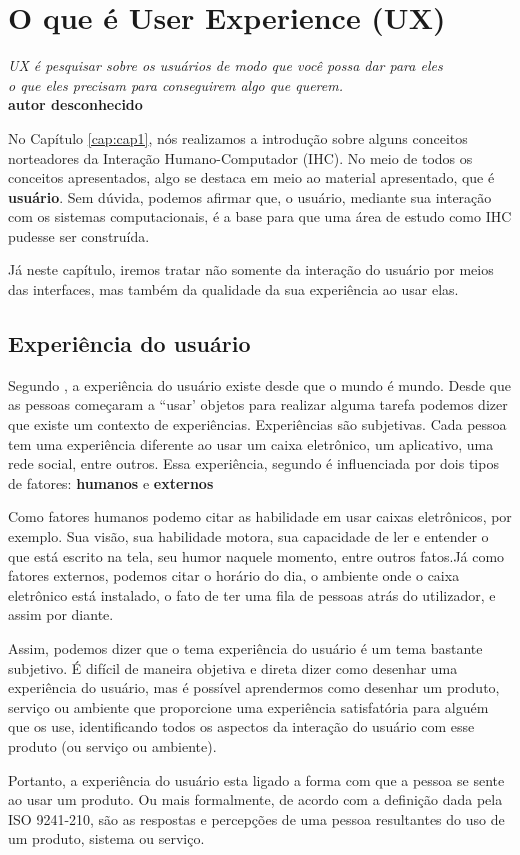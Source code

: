 \chapter{O que é User Experience (UX)}

\begin{flushright}
	\textit{
		UX é pesquisar sobre os usuários de modo que você possa dar para eles \\ o que eles precisam para conseguirem algo que querem.
	} \\
	
	\textbf{autor desconhecido}
\end{flushright}


No Capítulo \ref{cap:cap1}, nós realizamos a introdução sobre alguns conceitos norteadores da Interação Humano-Computador (IHC). No meio de todos os conceitos apresentados, algo se destaca em meio ao material apresentado, que é \textbf{usuário}. Sem dúvida, podemos afirmar que, o usuário, mediante sua interação com os sistemas computacionais, é a base para que uma área de estudo como IHC pudesse ser construída.

Já neste capítulo, iremos tratar não somente da interação do usuário por meios das interfaces, mas também da qualidade da sua experiência ao usar elas.

\section{Experiência do usuário}

Segundo , a experiência do usuário existe desde que o mundo é mundo. Desde que as pessoas começaram a ``usar' objetos para realizar alguma tarefa podemos dizer que existe um contexto de experiências. Experiências são subjetivas. Cada pessoa tem uma experiência
diferente ao usar um caixa eletrônico, um aplicativo, uma rede social, entre outros. Essa experiência, segundo  é
influenciada por dois tipos de fatores: \textbf{humanos} e \textbf{externos} 

Como fatores humanos podemo citar as habilidade em usar caixas eletrônicos, por exemplo. Sua visão, sua habilidade motora, sua capacidade de ler e entender o que está
escrito na tela, seu humor naquele momento, entre outros fatos.Já como fatores externos, podemos citar o horário do dia, o ambiente onde o caixa eletrônico está instalado, o fato de ter uma fila de pessoas atrás do utilizador, e assim por diante.

Assim, podemos dizer que o tema experiência do usuário é um tema bastante subjetivo. É difícil de maneira objetiva e direta dizer como desenhar uma experiência do usuário, mas é possível aprendermos como desenhar um produto, serviço ou ambiente que proporcione uma experiência satisfatória para alguém que os use, identificando todos os aspectos da interação do usuário com esse produto (ou serviço ou ambiente).

Portanto, a experiência do usuário esta ligado a forma com que a pessoa se sente ao usar um produto. Ou mais formalmente, de acordo com a definição dada pela ISO 9241-210, são as respostas e percepções de uma pessoa
resultantes do uso de um produto, sistema ou serviço.
